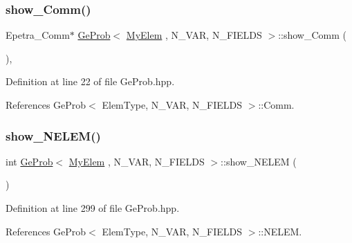 \mbox{\label{classGeProb_a810c17dc99110efbb57b8ad28adc5cb7}} 
\subsubsection{\texorpdfstring{show\+\_\+\+Comm()}{show\_Comm()}}
{\footnotesize\ttfamily Epetra\+\_\+\+Comm$\ast$ \hyperlink{classGeProb}{Ge\+Prob}$<$ \hyperlink{DG__Prob_8h_a83cd887ced9a6587428f267e50cd4787}{My\+Elem} , N\+\_\+\+V\+AR, N\+\_\+\+F\+I\+E\+L\+DS $>$\+::show\+\_\+\+Comm (\begin{DoxyParamCaption}{ }\end{DoxyParamCaption})\hspace{0.3cm}{\ttfamily [inline]}, {\ttfamily [inherited]}}



Definition at line 22 of file Ge\+Prob.\+hpp.



References Ge\+Prob$<$ Elem\+Type, N\+\_\+\+V\+A\+R, N\+\_\+\+F\+I\+E\+L\+D\+S $>$\+::\+Comm.

\mbox{\label{classGeProb_aa9c2c6d251e061c3cf58806097c55f04}} 
\subsubsection{\texorpdfstring{show\+\_\+\+N\+E\+L\+E\+M()}{show\_NELEM()}}
{\footnotesize\ttfamily int \hyperlink{classGeProb}{Ge\+Prob}$<$ \hyperlink{DG__Prob_8h_a83cd887ced9a6587428f267e50cd4787}{My\+Elem} , N\+\_\+\+V\+AR, N\+\_\+\+F\+I\+E\+L\+DS $>$\+::show\+\_\+\+N\+E\+L\+EM (\begin{DoxyParamCaption}{ }\end{DoxyParamCaption})\hspace{0.3cm}{\ttfamily [inherited]}}



Definition at line 299 of file Ge\+Prob.\+hpp.



References Ge\+Prob$<$ Elem\+Type, N\+\_\+\+V\+A\+R, N\+\_\+\+F\+I\+E\+L\+D\+S $>$\+::\+N\+E\+L\+EM.

